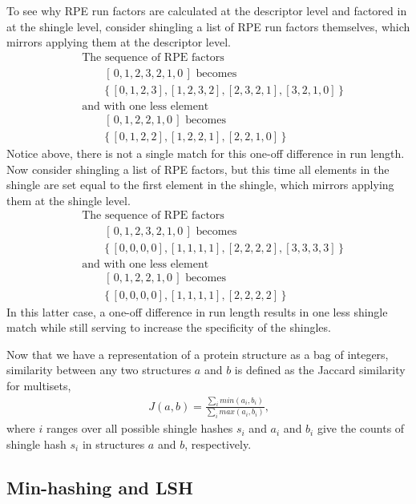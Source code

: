 \documentclass[a4,center,fleqn]{NAR}
\begin{document}
To see why RPE run factors are calculated at the descriptor level and factored in at the shingle level, consider shingling a list of RPE run factors themselves, which mirrors applying them at the descriptor level. 
\begin{align*}
    &\text{The sequence of RPE factors} \\
    &\qquad[\, 0, 1, 2, 3, 2, 1, 0 \,] \text{ becomes} \\
    &\qquad\{\, [0, 1, 2, 3], [1, 2, 3, 2], [2, 3, 2, 1], [3, 2, 1, 0] \,\} \\
    &\text{and with one less element} \\
    &\qquad[\, 0, 1, 2, 2, 1, 0 \,] \text{ becomes} \\
    &\qquad\{\, [0, 1, 2, 2], [1, 2, 2, 1], [2, 2, 1, 0] \,\}
\end{align*}
Notice above, there is not a single match for this one-off difference in run length.
Now consider shingling a list of RPE factors, but this time all elements in the shingle are set equal to the first element in the shingle, which mirrors applying them at the shingle level. 
\begin{align*}
    &\text{The sequence of RPE factors} \\
    &\qquad[\, 0, 1, 2, 3, 2, 1, 0 \,] \text{ becomes} \\
    &\qquad\{\, [0, 0, 0, 0], [1, 1, 1, 1], [2, 2, 2, 2], [3, 3, 3, 3] \,\} \\
    &\text{and with one less element} \\
    &\qquad[\, 0, 1, 2, 2, 1, 0 \,] \text{ becomes} \\
    &\qquad\{\, [0, 0, 0, 0], [1, 1, 1, 1], [2, 2, 2, 2] \,\}
\end{align*}
In this latter case, a one-off difference in run length results in one less shingle match while still serving to increase the specificity of the shingles. 

Now that we have a representation of a protein structure as a bag of integers, similarity between any two structures $a$ and $b$ is defined as the Jaccard similarity \cite{Levan1971} for multisets,
\begin{align}
    J(a,b) = \frac{\sum_i min(a_i, b_i)}{\sum_i max(a_i,b_i)}\text{,}
\end{align}
where $i$ ranges over all possible shingle hashes $s_i$ and $a_i$ and $b_i$ give the counts of shingle hash $s_i$ in structures $a$ and $b$, respectively. 

\subsection{Min-hashing and LSH}
\end{document}
